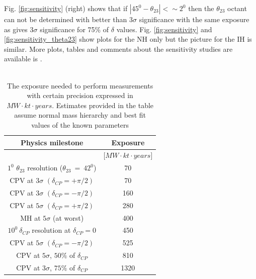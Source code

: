 Fig. \ref{fig:sensitivity} (right) shows that if $|45^0-\theta_{23}|<\sim 2^0$ then the $\theta_{23}$ octant can not be determined with better than $3\sigma$ significance with the same exposure as gives $3\sigma$ significance for 75\% of $\delta$ values. Fig. \ref{fig:sensitivity} and \ref{fig:sensitivity_theta23} show plots for the NH only but the picture for the IH is similar. More plots, tables and comments about the sensitivity studies are available is \cite{ref_LBNF_CDR}.\\ \\
\begin{table}[h]
  \centering
  \begin{center}
  \caption{ The exposure needed to perform measurements with certain precision expressed in $MW \cdot kt \cdot years$. Estimates provided in the table assume normal mass hierarchy and best fit values of the known parameters }
  \begin{tabular}{|c|c|}
  \hline  
  Physics milestone & Exposure  \\ \hline
   & [$MW \cdot kt \cdot years$]  \\ \hline
  $1^0$ $\theta_{23}$ resolution ($\theta_{23}~=~42^0$) & 70 \\ \hline
  CPV at $3\sigma$ $(\delta_{CP}=+\pi/2)$ & 70  \\ \hline
  CPV at $3\sigma$ $(\delta_{CP}=-\pi/2)$ & 160  \\ \hline
  CPV at $5\sigma$ $(\delta_{CP}=+\pi/2)$ & 280  \\ \hline
  MH at $5\sigma$ (at worst) & 400  \\ \hline
  $10^0~\delta_{CP}$ resolution at $\delta_{CP}=0$ & 450  \\ \hline
  CPV at $5\sigma$ $(\delta_{CP}=-\pi/2)$ & 525  \\ \hline
  CPV at $5\sigma$, $50\%$ of $\delta_{CP}$ & 810  \\ \hline
  CPV at $3\sigma$, $75\%$ of $\delta_{CP}$ & 1320  \\ \hline
  \end{tabular}
  \label{tab:exposures_needed}
  \end{center}
\end{table}
